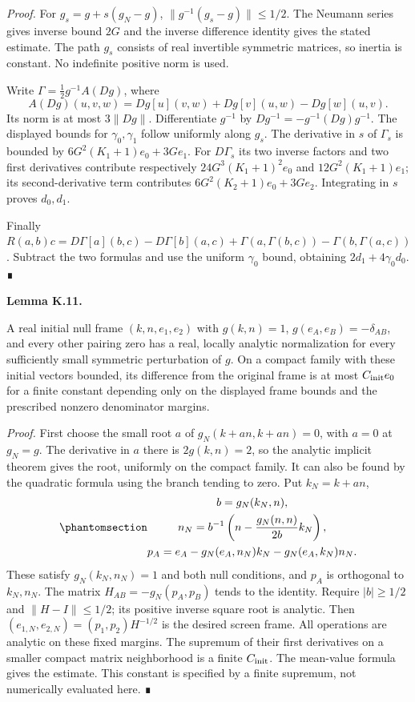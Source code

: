\documentclass[
  english,
  11pt,
  reqno]{amsart}
\makeatletter
\newcommand{\pandocstatementheading}[1]{%
  \par\addpenalty{\@beginparpenalty}%
  \addvspace{.5\baselineskip plus .2\baselineskip minus .2\baselineskip}%
  {\normalfont\bfseries #1\par}%
  \nobreak\@afterindenttrue\@afterheading
}
\makeatother
\begin{document}
\emph{Proof.} For \(g_s=g+s(g_N-g)\), \(\|g^{-1}(g_s-g)\|\le1/2\). The
Neumann series gives inverse bound \(2G\) and the inverse difference
identity gives the stated estimate. The path \(g_s\) consists of real
invertible symmetric matrices, so inertia is constant. No indefinite
positive norm is used.

Write \(\Gamma=\tfrac12g^{-1}A(Dg)\), where
\[A(Dg)(u,v,w)=Dg[u](v,w)+Dg[v](u,w)-Dg[w](u,v).\] Its norm is at most
\(3\|Dg\|\). Differentiate \(g^{-1}\) by \(Dg^{-1}=-g^{-1}(Dg)g^{-1}\).
The displayed bounds for \(\gamma_0,\gamma_1\) follow uniformly along
\(g_s\). The derivative in \(s\) of \(\Gamma_s\) is bounded by
\(6G^2(K_1+1)e_0+3Ge_1\). For \(D\Gamma_s\) its two inverse factors and
two first derivatives contribute respectively \(24G^3(K_1+1)^2e_0\) and
\(12G^2(K_1+1)e_1\); its second-derivative term contributes
\(6G^2(K_2+1)e_0+3Ge_2\). Integrating in \(s\) proves \(d_0,d_1\).

Finally
\(R(a,b)c=D\Gamma[a](b,c)-D\Gamma[b](a,c)+\Gamma(a,\Gamma(b,c))-\Gamma(b,\Gamma(a,c))\).
Subtract the two formulas and use the uniform \(\gamma_0\) bound,
obtaining \(2d_1+4\gamma_0d_0\). ∎

\pandocstatementheading{\protect{}\label{lem:sh-null-frame-initialization}Lemma K.11.}

A real initial null frame \((k,n,e_1,e_2)\) with \(g(k,n)=1\),
\(g(e_A,e_B)=-\delta_{AB}\), and every other pairing zero has a real,
locally analytic normalization for every sufficiently small symmetric
perturbation of \(g\). On a compact family with these initial vectors
bounded, its difference from the original frame is at most
\(C_{\rm init}e_0\) for a finite constant depending only on the
displayed frame bounds and the prescribed nonzero denominator margins.

\emph{Proof.} First choose the small root \(a\) of \(g_N(k+an,k+an)=0\),
with \(a=0\) at \(g_N=g\). The derivative in \(a\) there is
\(2g(k,n)=2\), so the analytic implicit theorem gives the root,
uniformly on the compact family. It can also be found by the quadratic
formula using the branch tending to zero. Put \(k_N=k+an\),
\begin{equation}\protect\phantomsection\label{eq:sh-null-frame-normalization}{\begin{gathered}
b=g_N(k_N,n), \\
n_N=b^{-1}\left(n-\frac{g_N(n,n)}{2b}k_N\right), \\
p_A=e_A-g_N(e_A,n_N)k_N-g_N(e_A,k_N)n_N.
\end{gathered}}\end{equation} These satisfy \(g_N(k_N,n_N)=1\) and both null
conditions, and \(p_A\) is orthogonal to \(k_N,n_N\). The matrix
\(H_{AB}=-g_N(p_A,p_B)\) tends to the identity. Require \(|b|\ge1/2\)
and \(\|H-I\|\le1/2\); its positive inverse square root is analytic.
Then \((e_{1,N},e_{2,N})=(p_1,p_2)H^{-1/2}\) is the desired screen
frame. All operations are analytic on these fixed margins. The supremum
of their first derivatives on a smaller compact matrix neighborhood is a
finite \(C_{\rm init}\). The mean-value formula gives the estimate. This
constant is specified by a finite supremum, not numerically evaluated
here. ∎
\end{document}
